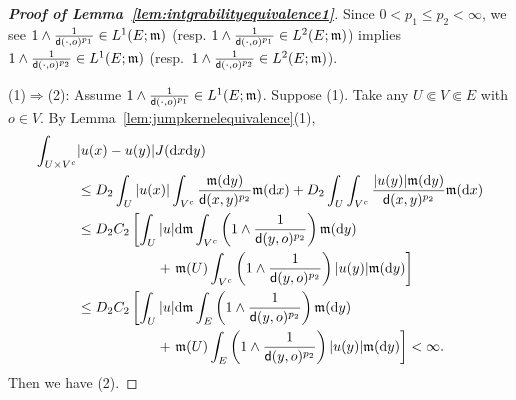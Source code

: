 \documentclass[12pt,a4paper]{article}
\renewcommand{\d}{\mathrm{d}}
\newcommand{\m}{\mathfrak{m} }
\newcommand{\1}{{\bf 1}}
\begin{document}
\begin{proof}[\bf Proof of Lemma~\ref{lem:intgrabilityequivalence1}]
Since $0<p_1\leq p_2<\infty$, we see    
$1\land\frac{1}{{\sf d}(\cdot,o)^{p_1}}\in L^1(E;{\m})$  
(resp. $1\land\frac{1}{{\sf d}(\cdot,o)^{p_1}}\in L^2(E;{\m})$) 
implies $1\land\frac{1}{{\sf d}(\cdot,o)^{p_2}}\in L^1(E;{\m})$ 
(resp.~$1\land\frac{1}{{\sf d}(\cdot,o)^{p_2}}\in L^2(E;{\m})$). 

(1)$\Longrightarrow$(2): 
Assume $1\land\frac{1}{{\sf d}(\cdot,o)^{p_1}}\in L^1(E;{\m})$. 
Suppose (1). Take any 
$U\Subset V\Subset E$ with $o\in V$. 
By Lemma~\ref{lem:jumpkernelequivalence}(1), 
\begin{align*}
\int_{U\times V^c}&|u(x)-u(y)|J({\d} x{\d} y)
\\
&\leq D_2\int_U|u(x)|\int_{V^c}
\frac{{\m}({\d} y)}{{\sf d}(x,y)^{p_2}}{\m}({\d} x)
+D_2\int_U\int_{V^c}\frac{|u(y)|{\m}({\d} y)}{{\sf d}(x,y)^{p_2}}{\m}({\d} x)\\
&\leq D_2C_2\left[\int_U|u|{\d}{\m}\int_{V^c}\left(1\land\frac{1}{{\sf d}(y,o)^{p_2}} \right){\m}({\d} y)\right.
\\
&\hspace{2cm}
+\left.{\m}(U)
\int_{V^c}\left(1\land\frac{1}{{\sf d}(y,o)^{p_2}} \right)|u(y)|{\m}({\d} y)\right]\\
&\leq D_2C_2\left[\int_U|u|{\d}{\m}\int_{E}\left(1\land\frac{1}{{\sf d}(y,o)^{p_2}} \right){\m}({\d} y)\right.
\\
&\hspace{2cm}
+\left.{\m}(U)
\int_{E}\left(1\land\frac{1}{{\sf d}(y,o)^{p_2}} \right)|u(y)|{\m}({\d} y)\right]
<\infty.
\end{align*}
Then we have (2).


\end{proof}
\end{document}
